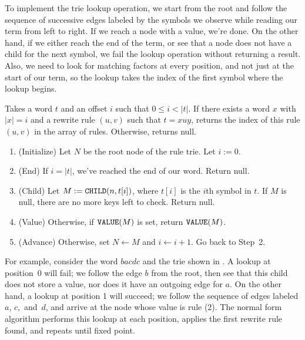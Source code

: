 \documentclass[../generics]{subfiles}
\begin{document}
To implement the trie lookup operation, we start from the root and follow the sequence of successive edges labeled by the symbols we observe while reading our term from left to right. If we reach a node with a value, we're done. On the other hand, if we either reach the end of the term, or see that a node does not have a child for the next symbol, we fail the lookup operation without returning a result. Also, we need to look for matching factors at every position, and not just at the start of our term, so the lookup takes the index of the first symbol where the lookup begins.

\begin{algorithm}\label{trie lookup algo}
Takes a word $t$ and an offset $i$ such that $0\leq i<|t|$. If there exists a word $x$ with $|x|=i$ and a rewrite rule $(u,v)$ such that $t=xuy$, returns the index of this rule $(u,v)$ in the array of rules. Otherwise, returns null.
\begin{enumerate}
\item (Initialize) Let $N$ be the root node of the rule trie. Let $i := 0$.
\item (End) If $i=|t|$, we've reached the end of our word. Return null.
\item (Child) Let $M := \texttt{CHILD}(n,t[i])$, where $t[i]$ is the $i$th symbol in $t$. If $M$ is null, there are no more keys left to check. Return null.
\item (Value) Otherwise, if $\texttt{VALUE}(M)$ is set, return $\texttt{VALUE}(M)$.
\item (Advance) Otherwise, set $N \leftarrow M$ and $i \leftarrow i+1$. Go back to Step~2.
\end{enumerate}
\end{algorithm}

For example, consider the word $bacdc$ and the trie shown in . A lookup at position~0 will fail; we follow the edge $b$ from the root, then see that this child does not store a value, nor does it have an outgoing edge for $a$. On the other hand, a lookup at position 1 will succeed; we follow the sequence of edges labeled $a$, $c$,~and~$d$, and arrive at the node whose value is rule (2). The normal form algorithm performs this lookup at each position, applies the first rewrite rule found, and repeats until fixed point.
\end{document}
